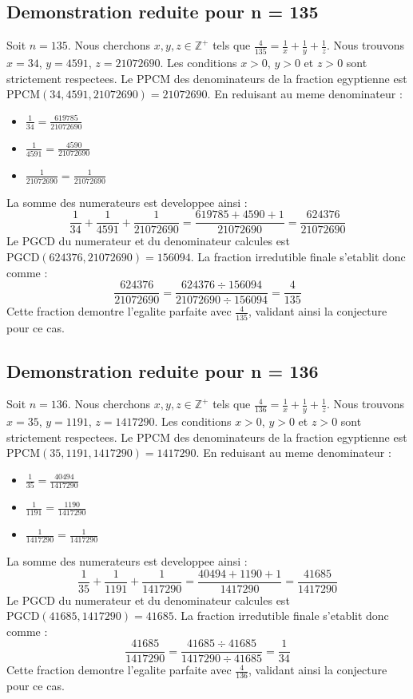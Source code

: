 \documentclass[11pt,a4paper]{article}
\begin{document}
\subsection{Demonstration reduite pour n = 135}
Soit $n = 135$. Nous cherchons $x, y, z \in \mathbb{Z}^{+}$ tels que $\frac{4}{135} = \frac{1}{x} + \frac{1}{y} + \frac{1}{z}$.
Nous trouvons $x = 34$, $y = 4591$, $z = 21072690$.
Les conditions $x > 0$, $y > 0$ et $z > 0$ sont strictement respectees.
Le PPCM des denominateurs de la fraction egyptienne est $\text{PPCM}(34, 4591, 21072690) = 21072690$.
En reduisant au meme denominateur :
\begin{itemize}
    \item $\frac{1}{34} = \frac{619785}{21072690}$
    \item $\frac{1}{4591} = \frac{4590}{21072690}$
    \item $\frac{1}{21072690} = \frac{1}{21072690}$
\end{itemize}
La somme des numerateurs est developpee ainsi :
$$ \frac{1}{34} + \frac{1}{4591} + \frac{1}{21072690} = \frac{619785 + 4590 + 1}{21072690} = \frac{624376}{21072690} $$
Le PGCD du numerateur et du denominateur calcules est $\text{PGCD}(624376, 21072690) = 156094$.
La fraction irredutible finale s'etablit donc comme :
$$ \frac{624376}{21072690} = \frac{624376 \div 156094}{21072690 \div 156094} = \frac{4}{135} $$
Cette fraction demontre l'egalite parfaite avec $\frac{4}{135}$, validant ainsi la conjecture pour ce cas.

\subsection{Demonstration reduite pour n = 136}
Soit $n = 136$. Nous cherchons $x, y, z \in \mathbb{Z}^{+}$ tels que $\frac{4}{136} = \frac{1}{x} + \frac{1}{y} + \frac{1}{z}$.
Nous trouvons $x = 35$, $y = 1191$, $z = 1417290$.
Les conditions $x > 0$, $y > 0$ et $z > 0$ sont strictement respectees.
Le PPCM des denominateurs de la fraction egyptienne est $\text{PPCM}(35, 1191, 1417290) = 1417290$.
En reduisant au meme denominateur :
\begin{itemize}
    \item $\frac{1}{35} = \frac{40494}{1417290}$
    \item $\frac{1}{1191} = \frac{1190}{1417290}$
    \item $\frac{1}{1417290} = \frac{1}{1417290}$
\end{itemize}
La somme des numerateurs est developpee ainsi :
$$ \frac{1}{35} + \frac{1}{1191} + \frac{1}{1417290} = \frac{40494 + 1190 + 1}{1417290} = \frac{41685}{1417290} $$
Le PGCD du numerateur et du denominateur calcules est $\text{PGCD}(41685, 1417290) = 41685$.
La fraction irredutible finale s'etablit donc comme :
$$ \frac{41685}{1417290} = \frac{41685 \div 41685}{1417290 \div 41685} = \frac{1}{34} $$
Cette fraction demontre l'egalite parfaite avec $\frac{4}{136}$, validant ainsi la conjecture pour ce cas.
\end{document}
